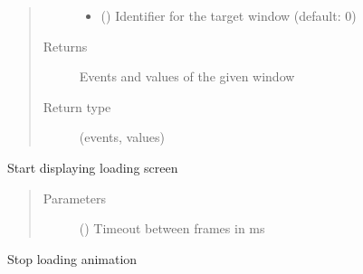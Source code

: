\documentclass[letterpaper,10pt,english]{sphinxmanual}
\begin{document}
\begin{fulllineitems}
\begin{fulllineitems}
\begin{quote}
\begin{description}
\begin{itemize}
\item {} 
\sphinxAtStartPar
{} () \textendash{} Identifier for the target window (default: 0)

\end{itemize}

\item[{Returns}] \leavevmode
\sphinxAtStartPar
Events and values of the given window

\item[{Return type}] \leavevmode
\sphinxAtStartPar
(events, values)

\end{description}\end{quote}

\end{fulllineitems}


\begin{fulllineitems}
\label{\detokenize{interface:interface.Interface.start_loading}}
\sphinxAtStartPar
Start displaying loading screen
\begin{quote}\begin{description}
\item[{Parameters}] \leavevmode
\sphinxAtStartPar
{} () \textendash{} Timeout between frames in ms

\end{description}\end{quote}

\end{fulllineitems}


\begin{fulllineitems}
\label{\detokenize{interface:interface.Interface.stop_loading}}
\sphinxAtStartPar
Stop loading animation

\end{fulllineitems}


\end{fulllineitems}
\end{document}
